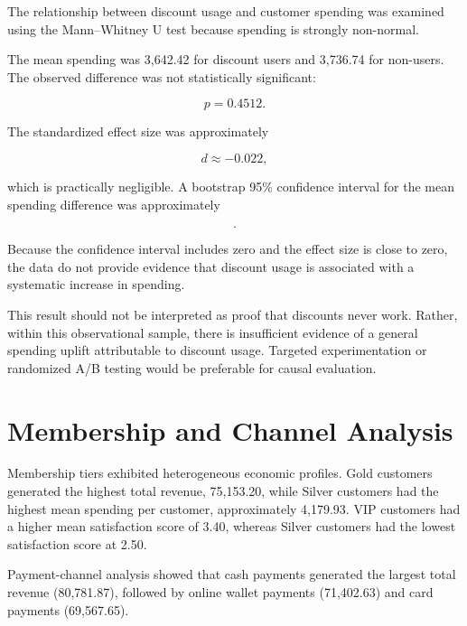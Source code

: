 \documentclass[11pt,a4paper]{article}
\begin{document}
The relationship between discount usage and customer spending was
examined using the Mann--Whitney U test because spending is strongly
non-normal.

The mean spending was 3,642.42 for discount users and 3,736.74 for
non-users. The observed difference was not statistically significant:

\begin{equation}
p=0.4512.
\end{equation}

The standardized effect size was approximately

\begin{equation}
d\approx -0.022,
\end{equation}

which is practically negligible. A bootstrap 95\% confidence interval
for the mean spending difference was approximately

\begin{equation}
[-2146.19,\;2400.88].
\end{equation}

Because the confidence interval includes zero and the effect size is
close to zero, the data do not provide evidence that discount usage is
associated with a systematic increase in spending.

This result should not be interpreted as proof that discounts never work.
Rather, within this observational sample, there is insufficient evidence
of a general spending uplift attributable to discount usage. Targeted
experimentation or randomized A/B testing would be preferable for causal
evaluation.

\section{Membership and Channel Analysis}

Membership tiers exhibited heterogeneous economic profiles. Gold
customers generated the highest total revenue, 75,153.20, while Silver
customers had the highest mean spending per customer, approximately
4,179.93. VIP customers had a higher mean satisfaction score of 3.40,
whereas Silver customers had the lowest satisfaction score at 2.50.

Payment-channel analysis showed that cash payments generated the largest
total revenue (80,781.87), followed by online wallet payments (71,402.63)
and card payments (69,567.65).
\end{document}

